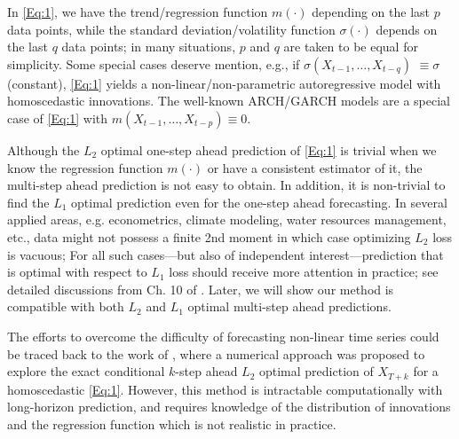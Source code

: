 \documentclass[a4paper]{article}
\begin{document}
In \cref{Eq:1}, we have the trend/regression function $m(\cdot)$ depending on the last $p$ data points, while the  standard deviation/volatility function $\sigma(\cdot)$ depends on the last $q$ data points;
in many situations, $p$ and $q$ are taken to be equal for simplicity. Some special cases deserve mention, e.g., if $\sigma(X_{t-1},\ldots, X_{t-q})$ $\equiv \sigma$ (constant), \cref{Eq:1} yields a non-linear/non-parametric autoregressive model with homoscedastic innovations.
The well-known ARCH/GARCH models are
a special case of  \cref{Eq:1} with $m(X_{t-1},\ldots, X_{t-p})\equiv 0$.   

 
Although the $L_2$ optimal one-step ahead prediction of \cref{Eq:1} is trivial when we know the regression function $m(\cdot)$ or have a consistent estimator of it, the multi-step ahead prediction is not easy to obtain. In addition, it is non-trivial to find the $L_1$ optimal prediction even for the one-step ahead forecasting. In several applied areas, e.g. econometrics, 
climate modeling, water resources management, etc., data might not possess a finite 2nd moment in which case optimizing $L_2$ loss is vacuous; For all such cases---but also of independent interest---prediction that is optimal with respect to $L_1$ loss should receive more attention in practice; see detailed discussions from Ch. 10 of \cite{politis2015model}. Later, we will show our method is compatible with both $L_2$ and $L_1$ optimal multi-step ahead predictions.

The efforts to overcome the difficulty of forecasting non-linear time series could be traced back to the work of \cite{pemberton1987exact}, where a numerical approach was proposed to explore the exact conditional $k$-step ahead $L_2$ optimal prediction of $X_{T+k}$ for a homoscedastic \cref{Eq:1}. However, this method is 
intractable computationally with long-horizon prediction, and
requires knowledge of the distribution of innovations and the regression function which is  not realistic in practice. 
\end{document}
